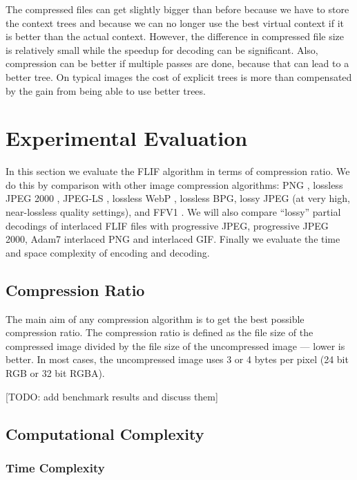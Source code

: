 \documentclass[a4paper,USenglish]{lipics}
\begin{document}
The compressed files can get slightly bigger than before
because we have to store the context trees and because we can no longer
use the best virtual context if it is better than the actual context.
However, the difference in compressed file size is relatively small while the
speedup for decoding can be significant.
Also, compression can be better if multiple passes are done, because that can lead to a better tree.
On typical images the cost of explicit trees is more than compensated by the gain from being able to use better trees.




\section{Experimental Evaluation} 
\label{sec:benchmarks}

In this section we evaluate the FLIF algorithm in terms of compression ratio.
We do this by comparison with other image compression algorithms:
PNG \cite{PNG}, lossless JPEG 2000 \cite{JPEG2000}, JPEG-LS \cite{JPEG-LS}, lossless WebP \cite{WebP},
lossless BPG, lossy JPEG \cite{JPEG} (at very high, near-lossless quality settings), and FFV1 \cite{FFV1}.
We will also compare ``lossy'' partial decodings of interlaced FLIF files
with progressive JPEG, progressive JPEG 2000, Adam7 interlaced PNG and interlaced GIF.
Finally we evaluate the time and space complexity of encoding and decoding.


\subsection{Compression Ratio}

The main aim of any compression algorithm is to get the best possible compression ratio.
The compression ratio is defined as the file size of the compressed image divided by the file size
of the uncompressed image --- lower is better.
In most cases, the uncompressed image uses 3 or 4 bytes per pixel (24 bit RGB or 32 bit RGBA).

[TODO: add benchmark results and discuss them]





\subsection{Computational Complexity}
\subsubsection{Time Complexity}
\end{document}
